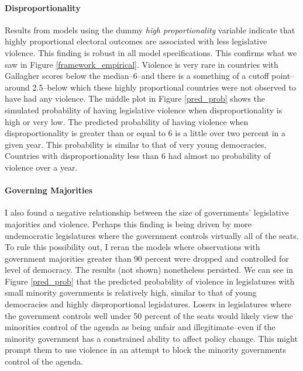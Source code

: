 \documentclass[a4paper]{article}\usepackage{graphicx, color}
\begin{document}
\paragraph{Disproportionality}
Results from models using the dummy {\emph{high proportionality}} variable indicate that highly proportional electoral outcomes are associated with less legislative violence. This finding is robust in all model specifications. This confirms what we saw in Figure \ref{framework_empirical}. Violence is very rare in countries with Gallagher scores below the median--6--and there is a something of a cutoff point--around 2.5--below which these highly proportional countries were not observed to have had any violence. The middle plot in Figure \ref{pred_prob} shows the simulated probability of having legislative violence when disproportionality is high or very low. The predicted probability of having violence when disproportionality is greater than or equal to 6 is a little over two percent in a given year. This probability is similar to that of very young democracies. Countries with disproportionality less than 6 had almost no probability of violence over a year.

\paragraph{Governing Majorities}
I also found a negative relationship between the size of governments' legislative majorities and violence. Perhaps this finding is being driven by more undemocratic legislatures where the government controls virtually all of the seats. To rule this possibility out, I reran the models where observations with government majorities greater than 90 percent were dropped and controlled for level of democracy. The results (not shown) nonetheless persisted. We can see in Figure \ref{pred_prob} that the predicted probability of violence in legislatures with small minority governments is relatively high, similar to that of young democracies and highly disproportional legislatures. Losers in legislatures where the government controls well under 50 percent of the seats would likely view the minorities control of the agenda as being unfair and illegitimate--even if the minority government has a constrained ability to affect policy change. This might prompt them to use violence in an attempt to block the minority governments control of the agenda. 
\end{document}
